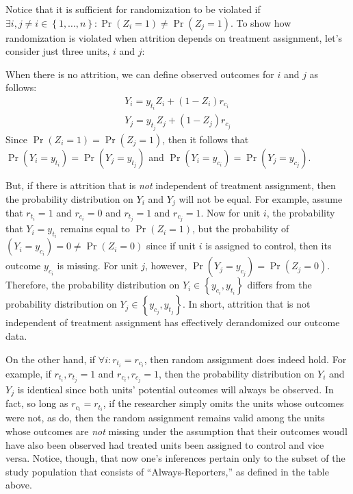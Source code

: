 \documentclass[11pt]{article}\usepackage[]{graphicx}\usepackage[]{color}
\theoremstyle{newstyle}
\begin{document}
Notice that it is sufficient for randomization to be violated if $\exists i, j \neq i \in \left\{1, \dots , n\right\}: \Pr\left(Z_i = 1\right) \neq \Pr\left(Z_j = 1\right)$. To show how randomization is violated when attrition depends on treatment assignment, let's consider just three units, $i$ and $j$:

When there is no attrition, we can define observed outcomes for $i$ and $j$ as follows:
\begin{align*}
Y_i = y_{t_i}Z_i + \left(1 - Z_i\right)r_{c_i} \\ 
Y_j = y_{t_j}Z_j + \left(1 - Z_j\right)r_{c_j}
\end{align*}
Since $\Pr\left(Z_i = 1\right) = \Pr\left(Z_j = 1\right)$, then it follows that $\Pr\left(Y_i = y_{t_i}\right) = \Pr\left(Y_j = y_{t_j}\right)$ and $\Pr\left(Y_i = y_{c_i}\right) = \Pr\left(Y_j = y_{c_j}\right)$.

But, if there is attrition that is \textit{not} independent of treatment assignment, then the probability distribution on $Y_i$ and $Y_j$ will not be equal. For example, assume that $r_{t_i} = 1$ and $r_{c_i} = 0$ and $r_{t_j} = 1$ and $r_{c_j} = 1$. Now for unit $i$, the probability that $Y_i = y_{t_i}$ remains equal to $\Pr\left(Z_i = 1\right)$, but the probability of $\left(Y_i = y_{c_i}\right) = 0 \neq \Pr\left(Z_i = 0\right)$ since if unit $i$ is assigned to control, then its outcome $y_{c_i}$ is missing. For unit $j$, however, $\Pr\left(Y_j = y_{c_j}\right) = \Pr\left(Z_j = 0\right)$. Therefore, the probability distribution on $Y_i \in \left\{y_{c_i}, y_{t_i}\right\}$ differs from the probability distribution on $Y_j \in \left\{y_{c_j}, y_{t_j}\right\}$. In short, attrition that is not independent of treatment assignment has effectively derandomized our outcome data.

On the other hand, if $\forall i: r_{t_i} = r_{c_i}$, then random assignment does indeed hold. For example, if $r_{t_i}, r_{t_j} = 1$ and $r_{c_i}, r_{c_j} = 1$, then the probability distribution on $Y_i$ and $Y_j$ is identical since both units' potential outcomes will always be observed. In fact, so long as $r_{c_i} = r_{t_i}$, if the researcher simply omits the units whose outcomes were not, as \citet{albertsonlawrence2009} do, then the random assignment remains valid among the units whose outcomes are \textit{not} missing under the assumption that their outcomes woudl have also been observed had treated units been assigned to control and vice versa. Notice, though, that now one's inferences pertain only to the subset of the study population that consists of ``Always-Reporters,'' as defined in the table above.
\end{document}
